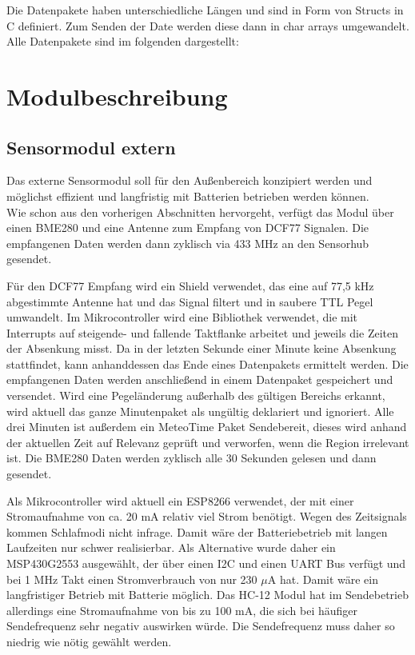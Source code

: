 \documentclass[a4paper,11pt]{article}
\begin{document}
\noindent
Die Datenpakete haben unterschiedliche Längen und sind in Form von Structs in C definiert. Zum Senden der Date werden diese dann in char arrays umgewandelt. \\
Alle Datenpakete sind im folgenden dargestellt:




\section{Modulbeschreibung}
\label{sub:modulbeschreibung}

\subsection{Sensormodul extern}
\label{subsub:sensorModul_ext}

Das externe Sensormodul soll für den Außenbereich konzipiert werden und möglichst effizient und langfristig mit Batterien betrieben werden können. \\
Wie schon aus den vorherigen Abschnitten hervorgeht, verfügt das Modul über einen BME280 und eine Antenne zum Empfang von DCF77 Signalen. 
Die empfangenen Daten werden dann zyklisch via 433 MHz an den Sensorhub gesendet.

\vspace{0.2cm}
\noindent
Für den DCF77 Empfang wird ein Shield verwendet, das eine auf 77,5 kHz abgestimmte Antenne hat und das Signal filtert und in saubere TTL Pegel umwandelt.
Im Mikrocontroller wird eine Bibliothek verwendet, die mit Interrupts auf steigende- und fallende Taktflanke arbeitet und jeweils die Zeiten der Absenkung misst. 
Da in der letzten Sekunde einer Minute keine Absenkung stattfindet, kann anhanddessen das Ende eines Datenpakets ermittelt werden. Die empfangenen Daten werden anschließend
in einem Datenpaket gespeichert und versendet. Wird eine Pegeländerung außerhalb des gültigen Bereichs erkannt, wird aktuell das ganze Minutenpaket als ungültig deklariert
und ignoriert. Alle drei Minuten ist außerdem ein MeteoTime Paket Sendebereit, dieses wird anhand der aktuellen Zeit auf Relevanz geprüft und verworfen, wenn die Region irrelevant ist. 
Die BME280 Daten werden zyklisch alle 30 Sekunden gelesen und dann gesendet. 

\vspace{0.2cm}
\noindent
Als Mikrocontroller wird aktuell ein ESP8266 verwendet, der mit einer Stromaufnahme von ca. 20 mA relativ viel Strom benötigt. Wegen des Zeitsignals kommen Schlafmodi nicht infrage. 
Damit wäre der Batteriebetrieb mit langen Laufzeiten nur schwer realisierbar. Als Alternative wurde daher ein MSP430G2553 ausgewählt, der über einen I2C und einen 
UART Bus verfügt und bei 1 MHz Takt einen Stromverbrauch von nur 230 $\mu$A hat. Damit wäre ein langfristiger Betrieb mit Batterie möglich. 
Das HC-12 Modul hat im Sendebetrieb allerdings eine Stromaufnahme von bis zu 100 mA, die sich bei häufiger Sendefrequenz sehr negativ auswirken würde. 
Die Sendefrequenz muss daher so niedrig wie nötig gewählt werden. 
\end{document}
